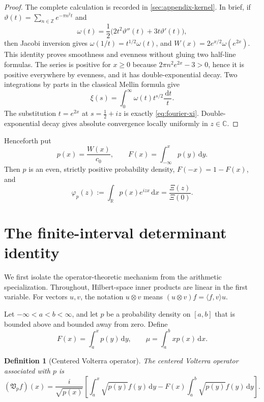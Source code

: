 \documentclass[11pt,reqno]{amsart}
\numberwithin{equation}{section}
\newtheorem{definition}[definition]{Definition}
\newcommand{\C}{\mathbb C}
\newcommand{\R}{\mathbb R}
\newcommand{\1}{\mathbf 1}
\newcommand{\Vp}{\mathfrak V_p}
\newcommand{\dd}{\,\mathrm d}
\begin{document}
\begin{proof}
The complete calculation is recorded in \cref{sec:appendix-kernel}.  In
brief, if $\vartheta(t)=\sum_{n\in\mathbb Z}e^{-\pi n^2t}$ and
\[
 \omega(t)=\frac12\bigl(2t^2\vartheta''(t)+3t\vartheta'(t)\bigr),
\]
then Jacobi inversion gives
$\omega(1/t)=t^{1/2}\omega(t)$, and
$W(x)=2e^{x/2}\omega(e^{2x})$.  This identity proves smoothness and evenness
without gluing two half-line formulas.  The series is positive for $x\geq0$
because $2\pi n^2e^{2x}-3>0$, hence it is positive everywhere by evenness,
and it has double-exponential decay.  Two integrations by parts in the
classical Mellin formula give
\[
 \xi(s)=\int_0^\infty\omega(t)t^{s/2}\frac{\dd t}{t}.
\]
The substitution $t=e^{2x}$ at $s=\tfrac12+iz$ is exactly
\eqref{eq:fourier-xi}.  Double-exponential decay gives absolute convergence
locally uniformly in $z\in\C$.
\end{proof}

Henceforth put
\begin{equation}\label{eq:pF-def}
 p(x)=\frac{W(x)}{c_0},
 \qquad
 F(x)=\int_{-\infty}^xp(y)\dd y.
\end{equation}
Then $p$ is an even, strictly positive probability density, $F(-x)=1-F(x)$,
and
\begin{equation}\label{eq:char-xi}
 \varphi_p(z):=\int_{\R}p(x)e^{izx}\dd x
 =\frac{\Xi(z)}{\Xi(0)}.
\end{equation}

\section{The finite-interval determinant identity}

We first isolate the operator-theoretic mechanism from the arithmetic
specialization.  Throughout, Hilbert-space inner products are linear in the
first variable.  For vectors $u,v$, the notation $u\otimes v$ means
$(u\otimes v)f=\langle f,v\rangle u$.

Let $-\infty<a<b<\infty$, and let $p$ be a probability density on $[a,b]$
that is bounded above and bounded away from zero.  Define
\begin{equation}\label{eq:finite-Fmu}
 F(x)=\int_a^xp(y)\dd y,
 \qquad
 \mu=\int_a^b xp(x)\dd x.
\end{equation}

\begin{definition}[Centered Volterra operator]\label{def:centered-volterra}
The centered Volterra operator associated with $p$ is
\begin{equation}\label{eq:finite-B}
 (\Vp f)(x)=\frac{i}{\sqrt{p(x)}}\left[
 \int_a^x\sqrt{p(y)}f(y)\dd y
 -F(x)\int_a^b\sqrt{p(y)}f(y)\dd y\right].
\end{equation}
\end{definition}
\end{document}
